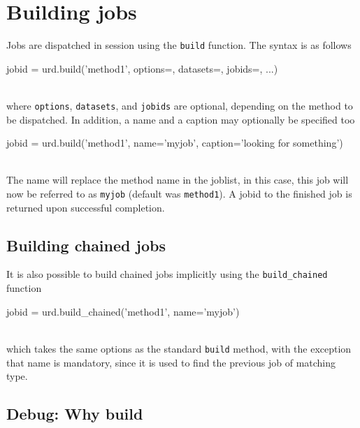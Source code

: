 \newpage
\section{Building jobs}

Jobs are dispatched in session using the \texttt{build} function.  The
syntax is as follows
\\
\begin{python}
  jobid = urd.build('method1', options={}, datasets={}, jobids={}, ...)
\end{python}
\\
where \texttt{options}, \texttt{datasets}, and \texttt{jobids} are
optional, depending on the method to be dispatched.  In addition, a
name and a caption may optionally be specified too
\\
\begin{python}
  jobid = urd.build('method1', name='myjob', caption='looking for something')
\end{python}
\\
The name will replace the method name in the joblist, in this case,
this job will now be referred to as \texttt{myjob} (default was
\texttt{method1}).  A jobid to the finished job is returned upon
successful completion.





\subsection{Building chained jobs}
It is also possible to build chained jobs implicitly using the
\texttt{build\_chained} function
\\
\begin{python}
  jobid = urd.build_chained('method1', name='myjob')
\end{python}
\\
which takes the same options as the standard \texttt{build} method,
with the exception that name is mandatory, since it is used to find
the previous job of matching type.



\subsection{Debug:  Why build}

